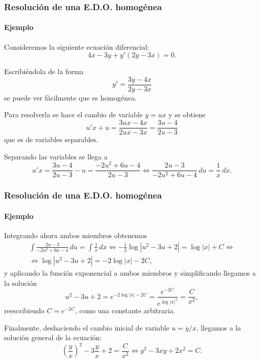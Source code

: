 \begin{frame}
	\frametitle{Resolución de una E.D.O. homogénea}
	\framesubtitle{Ejemplo}
	Consideremos la siguiente ecuación diferencial: 
	\[
		4x-3y+y'(2y-3x)=0.
	\]
		
	Escribiéndola de la forma
	\[
		y'=\frac{3y-4x}{2y-3x}
	\]
	se puede ver fácilmente que es homogénea.
		
	Para resolverla se hace el cambio de variable $y=ux$ y se obtiene
	\[
		u'x+u=\frac{3ux-4x}{2ux-3x}=\frac{3u-4}{2u-3}
	\]
	que es de variables separables.
		
	Separando las variables se llega a
	\[
		u'x=\frac{3u-4}{2u-3}-u=\frac{-2u^2+6u-4}{2u-3}\Leftrightarrow \frac{2u-3}{-2u^2+6u-4}\,du=\frac{1}{x}\,dx.
	\]
\end{frame}


\begin{frame}
	\frametitle{Resolución de una E.D.O. homogénea}
	\framesubtitle{Ejemplo}
	Integrando ahora ambos miembros obtenemos
	\[
		\renewcommand{\arraystretch}{2}
		\begin{array}{c}
			\displaystyle \int \frac{2u-3}{-2u^2+6u-4}\,du=\int \frac{1}{x}\,dx  
			\Leftrightarrow -\frac{1}{2}\log|u^2-3u+2|=\log|x|+C \Leftrightarrow \\
			\Leftrightarrow \log|u^2-3u+2|=-2\log|x|-2C,                         
		\end{array}
	\]
	y aplicando la función exponencial a ambos miembros y simplificando llegamos a la solución 
	\[
		u^2-3u+2=e^{-2\log|x|-2C}=\frac{e^{-2C}}{e^{\log|x|^2}}=\frac{C}{x^2},
	\]
	reescribiendo $C=e^{-2C}$, como una constante arbitraria.
		
	Finalmente, deshaciendo el cambio inicial de variable $u=y/x$, llegamos a la solución general de la ecuación:
	\[
		\left(\frac{y}{x}\right)^2-3\frac{y}{x}+2=\frac{C}{x^2}\Leftrightarrow y^2-3xy+2x^2=C.
	\]
\end{frame}



